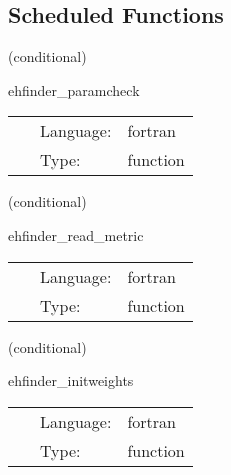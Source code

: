 \subsection*{Scheduled Functions}
\vspace{5mm}

   (conditional) 

\hspace{5mm} ehfinder\_paramcheck 

\hspace{5mm}{\it check parameters } 


\hspace{5mm}

 \begin{tabular*}{160mm}{cll} 
~ & Language:  & fortran \\ 
~ & Type:  & function \\ 
\end{tabular*} 


\vspace{5mm}

   (conditional) 

\hspace{5mm} ehfinder\_read\_metric 

\hspace{5mm}{\it read in metric from file } 


\hspace{5mm}

 \begin{tabular*}{160mm}{cll} 
~ & Language:  & fortran \\ 
~ & Type:  & function \\ 
\end{tabular*} 


\vspace{5mm}

   (conditional) 

\hspace{5mm} ehfinder\_initweights 

\hspace{5mm}{\it setup weights for simpson integration } 


\hspace{5mm}

 \begin{tabular*}{160mm}{cll} 
~ & Language:  & fortran \\ 
~ & Type:  & function \\ 
\end{tabular*} 


